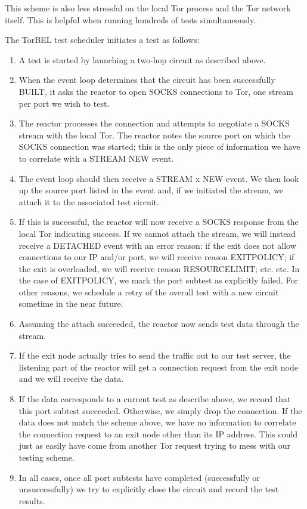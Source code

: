 \documentclass{article}
\begin{document}
This scheme is also less stressful on the local Tor process and the
Tor network itself.  This is helpful when running hundreds of tests
simultaneously.

The TorBEL test scheduler initiates a test as follows:
\begin{enumerate}
\item A test is started by launching a two-hop circuit as described
  above.
\item When the event loop determines that the circuit has been
  successfully BUILT, it asks the reactor to open SOCKS connections to
  Tor, one stream per port we wish to test.
\item The reactor processes the connection and attempts to negotiate a
  SOCKS stream with the local Tor.  The reactor notes the source port
  on which the SOCKS connection was started; this is the only piece of
  information we have to correlate with a STREAM NEW event.
\item The event loop should then receive a STREAM x NEW event.  We
  then look up the source port listed in the event and, if we
  initiated the stream, we attach it to the associated test circuit.
\item If this is successful, the reactor will now receive a SOCKS
  response from the local Tor indicating success.  If we cannot attach
  the stream, we will instead receive a DETACHED event with an error
  reason: if the exit does not allow connections to our IP and/or
  port, we will receive reason EXITPOLICY; if the exit is overloaded,
  we will receive reason RESOURCELIMIT; etc. etc.  In the case of
  EXITPOLICY, we mark the port subtest as explicitly failed.  For
  other reasons, we schedule a retry of the overall test with a new
  circuit sometime in the near future.
\item Assuming the attach succeeded, the reactor now sends test data through the stream.
\item If the exit node actually tries to send the traffic out to our
  test server, the listening part of the reactor will get a connection
  request from the exit node and we will receive the data.
\item If the data corresponds to a current test as describe above, we
  record that this port subtest succeeded.  Otherwise, we simply drop the
  connection.  If the data does not match the scheme above, we have no
  information to correlate the connection request to an exit node
  other than its IP address.  This could just as easily have come from
  another Tor request trying to mess with our testing scheme.
\item In all cases, once all port subtests have completed
  (successfully or unsuccessfully) we try to explicitly close the
  circuit and record the test results.

\end{enumerate}
\end{document}
